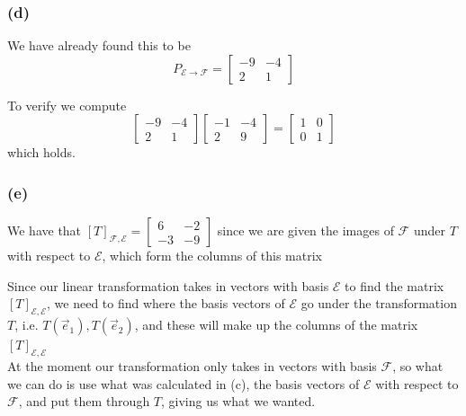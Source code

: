 \documentclass{article}
\begin{document}
\subsubsection*{(d)}
We have already found this to be
\[
P_{\mathcal{E}\rightarrow \mathcal{F}} = \begin{bmatrix}
        -9 & -4 \\ 
        2 & 1
    \end{bmatrix}
\]

To verify we compute 
\[
\begin{bmatrix}
        -9 & -4 \\
        2 & 1
    \end{bmatrix} \begin{bmatrix}
        -1 & -4 \\
        2 & 9
    \end{bmatrix} = \begin{bmatrix}
        1 & 0 \\
        0 & 1
    \end{bmatrix}
\]
which holds.


\subsubsection*{(e)}
We have that 
\(
[T]_{\mathcal{F}, \mathcal{E}} = \begin{bmatrix}
    6 & -2 \\
    -3 & -9
\end{bmatrix}
\)
since we are given the images of \(\mathcal{F}\) 
under \(T\) with respect to \(\mathcal{E}\), which form the columns of this matrix

Since our linear transformation takes in vectors with basis \(\mathcal{E}\) to find the matrix
\([T]_{\mathcal{E}, \mathcal{E}}\), we need to find where the basis vectors of \(\mathcal{E}\)
go under the transformation \(T\), i.e. \(T(\vec{e}_1), T{(\vec{e}_2)}\), and these will
make up the columns of the matrix \([T]_{\mathcal{E},\mathcal{E}}\)
\\

At the moment our transformation only takes in vectors with basis \(\mathcal{F}\), so what we can 
do is use what was calculated in (c), the basis vectors of \(\mathcal{E}\) with respect to 
\(\mathcal{F}\), and put them through \(T\), giving us what we wanted.
\end{document}
